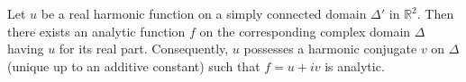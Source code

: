Let $u$ be a real harmonic function on a simply connected domain $\Delta'$ in $\mathbb{R}^2$. Then there exists an analytic function $f$ on the corresponding complex domain $\Delta$ having $u$ for its real part. Consequently, $u$ possesses a harmonic conjugate $v$ on $\Delta$ (unique up to an additive constant) such that $f = u + iv$ is analytic.

